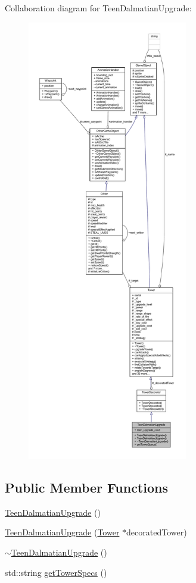 Collaboration diagram for Teen\+Dalmatian\+Upgrade\+:
\nopagebreak
\begin{figure}[H]
\begin{center}
\leavevmode
\includegraphics[height=550pt]{class_teen_dalmatian_upgrade__coll__graph}
\end{center}
\end{figure}
\subsection*{Public Member Functions}
\begin{DoxyCompactItemize}
\item 
\hyperlink{class_teen_dalmatian_upgrade_a4909c2ccf3bdc7be1811472fe6af3e27}{Teen\+Dalmatian\+Upgrade} ()
\item 
\hyperlink{class_teen_dalmatian_upgrade_a36935783afda88bfb639c41f8ad68959}{Teen\+Dalmatian\+Upgrade} (\hyperlink{class_tower}{Tower} $\ast$decorated\+Tower)
\item 
\hyperlink{class_teen_dalmatian_upgrade_aeaf1dd382e86ff5a3ba87d1cc2586c14}{$\sim$\+Teen\+Dalmatian\+Upgrade} ()
\item 
std\+::string \hyperlink{class_teen_dalmatian_upgrade_a5810149bbbc74a4560718ccb524612fa}{get\+Tower\+Specs} ()
\end{DoxyCompactItemize}
